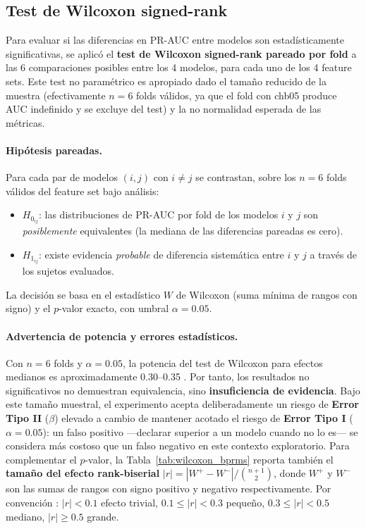 \documentclass[12pt,a4paper]{article}
\begin{document}
\subsection{Test de Wilcoxon signed-rank}

Para evaluar si las diferencias en PR-AUC entre modelos son estadísticamente significativas,
se aplicó el \textbf{test de Wilcoxon signed-rank pareado por fold} \cite{wilcoxon1945}
a las 6 comparaciones posibles entre los 4 modelos, para cada uno de los 4 feature sets.
Este test no paramétrico es apropiado dado el tamaño reducido de la muestra
(efectivamente $n = 6$ folds válidos, ya que el fold con chb05 produce AUC indefinido
y se excluye del test) y la no normalidad esperada de las métricas.

\paragraph{Hipótesis pareadas.}
Para cada par de modelos $(i, j)$ con $i \neq j$ se contrastan, sobre los $n=6$ folds
válidos del feature set bajo análisis:
\begin{itemize}
\item $H_{0_{ij}}$: las distribuciones de PR-AUC por fold de los modelos $i$ y $j$
  son \textit{posiblemente} equivalentes (la mediana de las diferencias pareadas es
  cero).
\item $H_{1_{ij}}$: existe evidencia \textit{probable} de diferencia sistemática entre
  $i$ y $j$ a través de los sujetos evaluados.
\end{itemize}
La decisión se basa en el estadístico $W$ de Wilcoxon (suma mínima de rangos con
signo) y el $p$-valor exacto, con umbral $\alpha = 0.05$.

\paragraph{Advertencia de potencia y errores estadísticos.}
Con $n=6$ folds y $\alpha=0.05$, la potencia del test de Wilcoxon para efectos
medianos es aproximadamente 0.30--0.35 \cite{cohen1988}. Por tanto, los resultados
no significativos no demuestran equivalencia, sino \textbf{insuficiencia de evidencia}.
Bajo este tamaño muestral, el experimento acepta deliberadamente un riesgo de
\textbf{Error Tipo II} ($\beta$) elevado a cambio de mantener acotado el riesgo de
\textbf{Error Tipo I} ($\alpha=0.05$): un falso positivo —declarar superior a un
modelo cuando no lo es— se considera más costoso que un falso negativo en este
contexto exploratorio. Para complementar el $p$-valor, la Tabla~\ref{tab:wilcoxon_bprms}
reporta también el \textbf{tamaño del efecto rank-biserial} $|r| = |W^{+} - W^{-}| /
\binom{n+1}{2}$, donde $W^{+}$ y $W^{-}$ son las sumas de rangos con signo positivo
y negativo respectivamente. Por convención \cite{cohen1988}: $|r| < 0.1$ efecto
trivial, $0.1 \leq |r| < 0.3$ pequeño, $0.3 \leq |r| < 0.5$ mediano, $|r| \geq 0.5$
grande.
\end{document}
